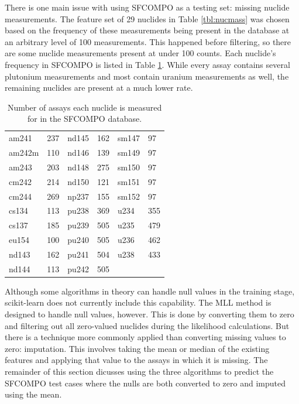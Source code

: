 There is one main issue with using \gls{SFCOMPO} as a testing set: missing
nuclide measurements.  The feature set of 29 nuclides in Table
\ref{tbl:nucmass} was chosen based on the frequency of these measurements being
present in the database at an arbitrary level of 100 measurements. This
happened before filtering, so there are some nuclide measurements present at
under 100 counts.  Each nuclide's frequency in \gls{SFCOMPO} is listed in Table
\ref{tbl:missing}.  While every assay contains several plutonium measurements
and most contain uranium measurements as well, the remaining nuclides are
present at a much lower rate. 

\begin{table}[!htb]
  \centering
  \begin{tabular}{>{\raggedleft}m{0.6in}
                                m{0.4in}
                  >{\raggedleft}m{0.6in}
                                m{0.4in}
                  >{\raggedleft}m{0.6in}
                                m{0.4in}}
    \toprule
    \rowcolor[gray]{0.88} am241  & 237 & nd145 & 162 & sm147 & 97  \\  
    \rowcolor[gray]{0.95} am242m & 110 & nd146 & 139 & sm149 & 97  \\ 
    \rowcolor[gray]{0.88} am243  & 203 & nd148 & 275 & sm150 & 97  \\ 
    \rowcolor[gray]{0.95} cm242  & 214 & nd150 & 121 & sm151 & 97  \\ 
    \rowcolor[gray]{0.88} cm244  & 269 & np237 & 155 & sm152 & 97  \\ 
    \rowcolor[gray]{0.95} cs134  & 113 & pu238 & 369 & u234  & 355 \\ 
    \rowcolor[gray]{0.88} cs137  & 185 & pu239 & 505 & u235  & 479 \\ 
    \rowcolor[gray]{0.95} eu154  & 100 & pu240 & 505 & u236  & 462 \\ 
    \rowcolor[gray]{0.88} nd143  & 162 & pu241 & 504 & u238  & 433 \\ 
    \rowcolor[gray]{0.95} nd144  & 113 & pu242 & 505 &       &     \\ \bottomrule
  \end{tabular}
  \caption{Number of assays each nuclide is measured for in the \gls{SFCOMPO}
           database.}
  \label{tbl:missing}
\end{table}

Although some algorithms in theory can handle null values in the training
stage, scikit-learn does not currently include this capability. The \gls{MLL}
method is designed to handle null values, however. This is done by converting
them to zero and filtering out all zero-valued nuclides during the likelihood
calculations. But there is a technique more commonly applied than converting
missing values to zero: imputation. This involves taking the mean or median of
the existing features and applying that value to the assays in which it is
missing.  The remainder of this section dicusses using the three algorithms to
predict the \gls{SFCOMPO} test cases where the nulls are both converted to zero
and imputed using the mean.  

